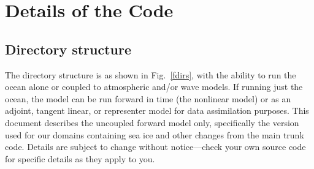 \section{Details of the Code}
\label{Code}
\subsection{Directory structure}
The directory structure is as shown in Fig.\ \ref{fdirs}, with the
ability to run the ocean alone or coupled to atmospheric and/or
wave models. If running just the ocean, the model can be run forward
in time (the nonlinear model) or as an adjoint, tangent linear, or
representer model for data assimilation purposes. This document
describes the uncoupled forward model only, specifically the version
used for our domains containing sea ice and other
changes from the main trunk code. Details are subject to change
without notice---check your own source code for specific details as
they apply to you.

